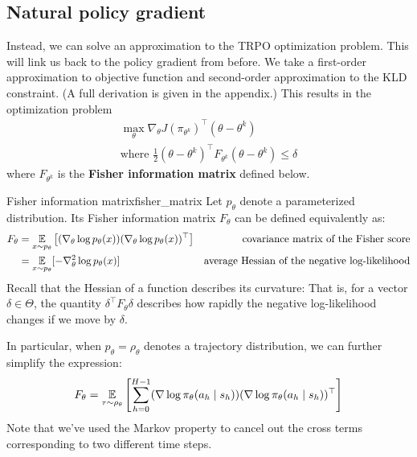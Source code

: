 \documentclass[\main/main]{subfiles}
\begin{document}
\subsection{Natural policy gradient}

Instead, we can solve an approximation to the TRPO optimization problem. This will link us back to the policy gradient from before. We take a first-order approximation to objective function and second-order approximation to the KLD constraint. (A full derivation is given in the appendix.)  This results in the optimization problem
\begin{equation}
    \begin{gathered}
        \max_\theta \nabla_\theta J(\pi_{\theta^k})^\top (\theta - \theta^k) \\
        \text{where } \frac{1}{2} (\theta - \theta^k)^\top F_{\theta^k} (\theta - \theta^k) \le \delta
    \end{gathered}
    \label{npg_optimization}
\end{equation}
where $F_{\theta^k}$ is the \textbf{Fisher information matrix} defined below.
\begin{definition}{Fisher information matrix}{fisher_matrix}
    Let $p_\theta$ denote a parameterized distribution. Its Fisher information matrix $F_\theta$ can be defined equivalently as:
    \begin{align*}
        F_{\theta} & = \operatorname*{\mathbb{E}}_{x \sim p_\theta} \left[ (\nabla_\theta \log p_\theta(x)) (\nabla_\theta \log p_\theta(x))^\top \right] & \text{covariance matrix of the Fisher score}          \\
                   & = \operatorname*{\mathbb{E}}_{x \sim p_{\theta}} [- \nabla_\theta^2 \log p_\theta(x)]                                                & \text{average Hessian of the negative log-likelihood}
    \end{align*}
    Recall that the Hessian of a function describes its curvature: That is, for a vector $\delta \in \Theta$, the quantity $\delta^\top F_\theta \delta$ describes how rapidly the negative log-likelihood changes if we move by $\delta$.

    In particular, when $p_\theta = \rho_{\theta}$ denotes a trajectory distribution, we can further simplify the expression:
    \begin{equation}
        F_{\theta} = \operatorname*{\mathbb{E}}_{\tau \sim \rho_\theta} \left[ \sum_{h=0}^{H-1} (\nabla \log \pi_\theta (a_h \mid s_h)) (\nabla \log \pi_\theta(a_h \mid s_h))^\top \right]
        \label{eq:fisher_trajectory}
    \end{equation}
    Note that we've used the Markov property to cancel out the cross terms corresponding to two different time steps.
\end{definition}
\end{document}
